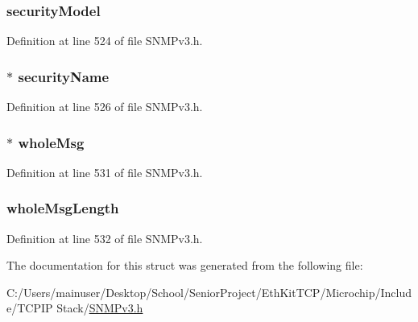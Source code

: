 \subsubsection[{security\+Model}]{ security\+Model}\label{struct_security_sys_generate_response_msg_ac19ed44216346e9d6c50819813db6867}


Definition at line 524 of file S\+N\+M\+Pv3.\+h.

\hypertarget{struct_security_sys_generate_response_msg_a4a48a8746988a1f761c3e9eadcc20463}{}
\subsubsection[{security\+Name}]{$\ast$ security\+Name}\label{struct_security_sys_generate_response_msg_a4a48a8746988a1f761c3e9eadcc20463}


Definition at line 526 of file S\+N\+M\+Pv3.\+h.

\hypertarget{struct_security_sys_generate_response_msg_a004e34c44705bf128556c60cca7a6586}{}
\subsubsection[{whole\+Msg}]{$\ast$ whole\+Msg}\label{struct_security_sys_generate_response_msg_a004e34c44705bf128556c60cca7a6586}


Definition at line 531 of file S\+N\+M\+Pv3.\+h.

\hypertarget{struct_security_sys_generate_response_msg_ae69530a979f1b7b71b437d128ffc63ff}{}
\subsubsection[{whole\+Msg\+Length}]{ whole\+Msg\+Length}\label{struct_security_sys_generate_response_msg_ae69530a979f1b7b71b437d128ffc63ff}


Definition at line 532 of file S\+N\+M\+Pv3.\+h.



The documentation for this struct was generated from the following file\+:\begin{DoxyCompactItemize}
\item 
C\+:/\+Users/mainuser/\+Desktop/\+School/\+Senior\+Project/\+Eth\+Kit\+T\+C\+P/\+Microchip/\+Include/\+T\+C\+P\+I\+P Stack/\hyperlink{_s_n_m_pv3_8h}{S\+N\+M\+Pv3.\+h}\end{DoxyCompactItemize}
